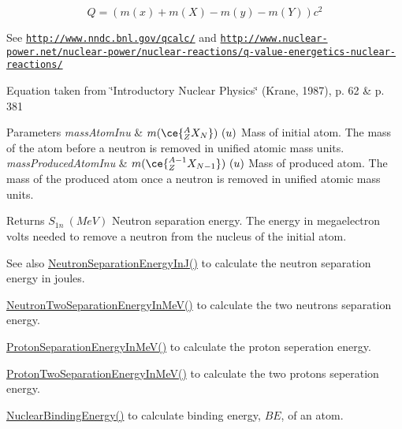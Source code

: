 \[Q = \left ( m(x) + m (X) - m(y) - m(Y) \right ) c^2\]

See \href{http://www.nndc.bnl.gov/qcalc/}{\tt http\+://www.\+nndc.\+bnl.\+gov/qcalc/} and \href{http://www.nuclear-power.net/nuclear-power/nuclear-reactions/q-value-energetics-nuclear-reactions/}{\tt http\+://www.\+nuclear-\/power.\+net/nuclear-\/power/nuclear-\/reactions/q-\/value-\/energetics-\/nuclear-\/reactions/}

Equation taken from \char`\"{}\+Introductory Nuclear Physics\char`\"{} (Krane, 1987), p. 62 \& p. 381


\begin{DoxyParams}{Parameters}
{\em mass\+Atom\+Inu} & $m(\ce{ ^{A}_{Z}X_{N} })\ (u)$ Mass of initial atom. The mass of the atom before a neutron is removed in unified atomic mass units. \\
\hline
{\em mass\+Produced\+Atom\+Inu} & $m(\ce{ ^{A-1}_{Z}X_{N-1} })\ (u)$ Mass of produced atom. The mass of the produced atom once a neutron is removed in unified atomic mass units. \\
\hline
\end{DoxyParams}
\begin{DoxyReturn}{Returns}
$S_{1n}\ (MeV)$ Neutron separation energy. The energy in megaelectron volts needed to remove a neutron from the nucleus of the initial atom. 
\end{DoxyReturn}
\begin{DoxySeeAlso}{See also}
\hyperlink{group___nuclear_separation_energy_ga14a4bb972ae000ef4ff35f2734ff22d0}{Neutron\+Separation\+Energy\+In\+J()} to calculate the neutron separation energy in joules. 

\hyperlink{group___nuclear_separation_energy_ga09985fc876eb632695bfbc1f2f325401}{Neutron\+Two\+Separation\+Energy\+In\+Me\+V()} to calculate the two neutrons separation energy. 

\hyperlink{group___nuclear_separation_energy_ga6a619ded55c47ed22ea2d8a85202ebeb}{Proton\+Separation\+Energy\+In\+Me\+V()} to calculate the proton seperation energy. 

\hyperlink{group___nuclear_separation_energy_ga0de42783a7c650eb32f85dc2d40d84d7}{Proton\+Two\+Separation\+Energy\+In\+Me\+V()} to calculate the two protons seperation energy. 

\hyperlink{group___nuclear_binding_energy_gafea41a3c21704414394c3204b35aba98}{Nuclear\+Binding\+Energy()} to calculate binding energy, $BE$, of an atom. 
\end{DoxySeeAlso}
